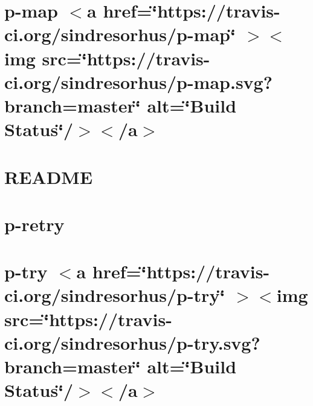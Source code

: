 \documentclass[twoside]{book}
\newcommand{\+}{\discretionary{\mbox{\scriptsize$\hookleftarrow$}}{}{}}
\begin{document}
\chapter{p-\/map \texorpdfstring{$<$}{<}a href=\char`\"{}https\+://travis-\/ci.\+org/sindresorhus/p-\/map\char`\"{} \texorpdfstring{$>$}{>}\texorpdfstring{$<$}{<}img src=\char`\"{}https\+://travis-\/ci.\+org/sindresorhus/p-\/map.\+svg?branch=master\char`\"{} alt=\char`\"{}\+Build Status\char`\"{}/\texorpdfstring{$>$}{>}\texorpdfstring{$<$}{<}/a\texorpdfstring{$>$}{>}}
\label{md__c___users_vaishnavi_jadhav__desktop__developer_code_mean_stack_example_client_node_modules_p_map_readme}

\chapter{README}
\label{md__c___users_vaishnavi_jadhav__desktop__developer_code_mean_stack_example_client_node_modules_p8fa88604b68e4440c8bd1d2a34439288}

\chapter{p-\/retry}
\label{md__c___users_vaishnavi_jadhav__desktop__developer_code_mean_stack_example_client_node_modules_p_retry_readme}

\chapter{p-\/try \texorpdfstring{$<$}{<}a href=\char`\"{}https\+://travis-\/ci.\+org/sindresorhus/p-\/try\char`\"{} \texorpdfstring{$>$}{>}\texorpdfstring{$<$}{<}img src=\char`\"{}https\+://travis-\/ci.\+org/sindresorhus/p-\/try.\+svg?branch=master\char`\"{} alt=\char`\"{}\+Build Status\char`\"{}/\texorpdfstring{$>$}{>}\texorpdfstring{$<$}{<}/a\texorpdfstring{$>$}{>}}
\label{md__c___users_vaishnavi_jadhav__desktop__developer_code_mean_stack_example_client_node_modules_p_try_readme}

\end{document}
